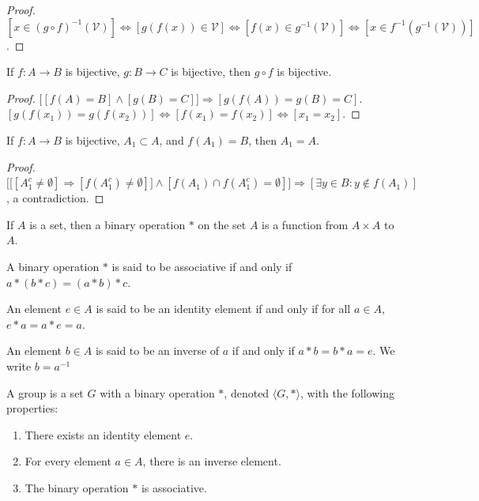 \documentclass[crop=false,class=book,oneside]{standalone}
\begin{document}
        \begin{proof}
        $[x\in (g\circ f)^{-1}(\mathcal{V})]\Leftrightarrow [g(f(x))\in \mathcal{V}] \Leftrightarrow [f(x)\in g^{-1}(\mathcal{V})]\Leftrightarrow [x\in f^{-1}(g^{-1}(\mathcal{V}))]$.
        \end{proof}
        \begin{theorem}
        If $f:A\rightarrow B$ is bijective, $g:B\rightarrow C$ is bijective, then $g\circ f$ is bijective.
        \end{theorem}
        \begin{proof}
        $\big[[f(A) = B]\land [g(B) = C]\big]\Rightarrow [g(f(A)) = g(B) = C]$. $[g(f(x_1))=g(f(x_2))]\Leftrightarrow [f(x_1)=f(x_2)]\Leftrightarrow [x_1=x_2]$.
        \end{proof}
        \begin{theorem}
        If $f:A\rightarrow B$ is bijective, $A_1\subset A$, and $f(A_1) = B$, then $A_1=A$.
        \end{theorem}
        \begin{proof}
        $\Big[\big[[A_1^c \ne \emptyset]\Rightarrow [f(A_1^c) \ne \emptyset]\big]\land[f(A_1)\cap f(A_1^c) = \emptyset]\Big]\Rightarrow [\exists y\in B:y\notin f(A_1)]$, a contradiction.
        \end{proof}
        \begin{definition}
        If $A$ is a set, then a binary operation $*$ on the set $A$ is a function from $A\times A$ to $A$.
        \end{definition}
        \begin{definition}
        A binary operation $*$ is said to be associative if and only if $a*(b*c) = (a*b)*c$.
        \end{definition}
        \begin{definition}
        An element $e\in A$ is said to be an identity element if and only if for all $a\in A$, $e*a = a*e = a$.
        \end{definition}
        \begin{definition}
        An element $b\in A$ is said to be an inverse of $a$ if and only if $a*b=b*a = e$. We write $b=a^{-1}$
        \end{definition}
        \begin{definition}[Group]
        A group is a set $G$ with a binary operation $*$, denoted $\langle G,* \rangle$, with the following properties: 
        \begin{enumerate}
        \item There exists an identity element $e$.
        \item For every element $a\in A$, there is an inverse element.
        \item The binary operation $*$ is associative.
        \end{enumerate}
        \end{definition}
\end{document}
